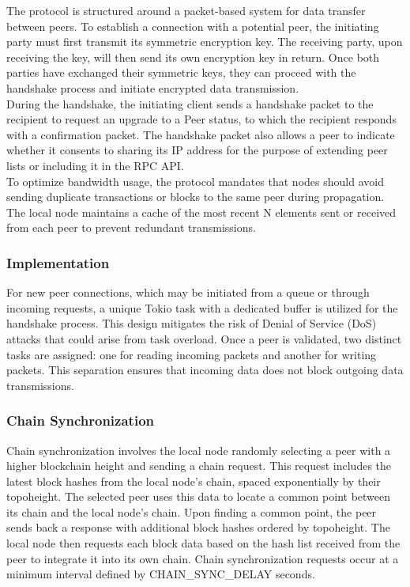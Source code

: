 \documentclass[10pt,a4paper,twocolumn]{article}
\begin{document}
The protocol is structured around a packet-based system for data transfer between peers. To establish a connection with a potential peer, the initiating party must first transmit its symmetric encryption key. The receiving party, upon receiving the key, will then send its own encryption key in return. Once both parties have exchanged their symmetric keys, they can proceed with the handshake process and initiate encrypted data transmission.\\

During the handshake, the initiating client sends a handshake packet to the recipient to request an upgrade to a Peer status, to which the recipient responds with a confirmation packet. The handshake packet also allows a peer to indicate whether it consents to sharing its IP address for the purpose of extending peer lists or including it in the RPC API.\\

To optimize bandwidth usage, the protocol mandates that nodes should avoid sending duplicate transactions or blocks to the same peer during propagation. The local node maintains a cache of the most recent N elements sent or received from each peer to prevent redundant transmissions.\\

\subsubsection{Implementation}

For new peer connections, which may be initiated from a queue or through incoming requests, a unique Tokio task with a dedicated buffer is utilized for the handshake process. This design mitigates the risk of Denial of Service (DoS) attacks that could arise from task overload. Once a peer is validated, two distinct tasks are assigned: one for reading incoming packets and another for writing packets. This separation ensures that incoming data does not block outgoing data transmissions.\\

\subsubsection{Chain Synchronization}

Chain synchronization involves the local node randomly selecting a peer with a higher blockchain height and sending a chain request. This request includes the latest block hashes from the local node’s chain, spaced exponentially by their topoheight. The selected peer uses this data to locate a common point between its chain and the local node’s chain. Upon finding a common point, the peer sends back a response with additional block hashes ordered by topoheight. The local node then requests each block data based on the hash list received from the peer to integrate it into its own chain. Chain synchronization requests occur at a minimum interval defined by CHAIN\_SYNC\_DELAY seconds.\\
\end{document}

